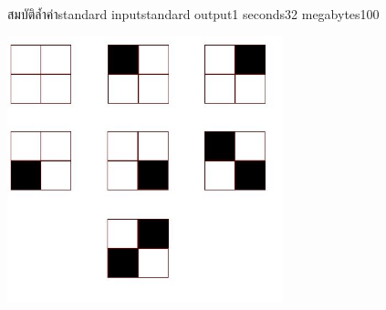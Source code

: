 \documentclass[11pt,a4paper]{article}
\begin{document}
\begin{problem}{สมบัติล้ำค่า}{standard input}{standard output}{1 seconds}{32 megabytes}{100}
\begin{note}
\begin{center}
\includegraphics[width=8cm]{Sample.jpg}
\end{center}

\end{note}

\end{problem}
\end{document}

